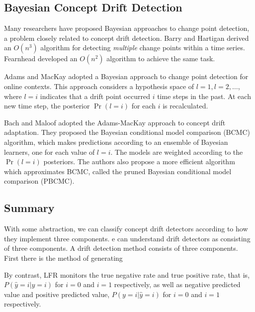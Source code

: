 \subsection{Bayesian Concept Drift Detection}

Many researchers have proposed Bayesian approaches to change point detection, a problem closely related to concept drift detection. Barry and Hartigan \cite{barry_hartigan} derived an $O(n^3)$ algorithm for detecting {\it multiple} change points within a time series. Fearnhead \cite{fearnhead} developed an $O(n^2)$ algorithm to achieve the same task. 

Adams and MacKay \cite{adams_mackay} adopted a Bayesian approach to change point detection for online contexts. This approach considers a hypothesis space of $l=1, l=2, \dots$, where $l=i$ indicates that a drift point occurred $i$ time steps in the past. At each new time step, the posterior $\Pr(l=i)$ for each $i$ is recalculated.

Bach and Maloof \cite{BCMC} adopted the Adams-MacKay approach to concept drift adaptation. They proposed the Bayesian conditional model comparison (BCMC) algorithm, which makes predictions according to an ensemble of Bayesian learners, one for each value of $l=i$. The models are weighted according to the $\Pr(l=i)$ posteriors. The authors also propose a more efficient algorithm which approximates BCMC, called the pruned Bayesian conditional model comparison (PBCMC).

\subsection{Summary}

With some abstraction, we can classify concept drift detectors according to how they implement three components.  e can understand drift detectors as consisting of three components. A drift detection method consists of three components. First there is the method of generating 


By contrast, LFR monitors the true negative rate and true positive rate, that is, $P(\hat{y}=i|y=i)$ for $i=0$ and $i=1$ respectively, as well as negative predicted value and positive predicted value, $P(y=i|\hat{y}=i)$ for $i=0$ and $i=1$ respectively. 


